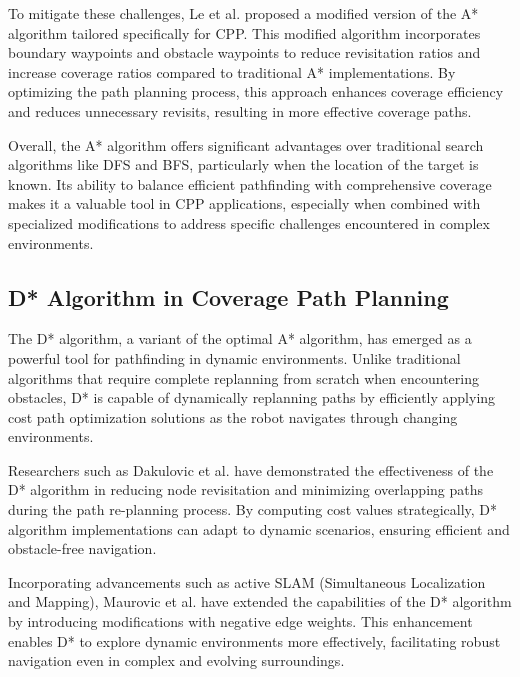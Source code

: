 \vspace*{6mm}

To mitigate these challenges, Le et al. proposed a modified version of the A* algorithm tailored specifically for CPP. This modified algorithm incorporates boundary waypoints and obstacle waypoints to reduce revisitation ratios and increase coverage ratios compared to traditional A* implementations. By optimizing the path planning process, this approach enhances coverage efficiency and reduces unnecessary revisits, resulting in more effective coverage paths.

\vspace*{6mm}

Overall, the A* algorithm offers significant advantages over traditional search algorithms like DFS and BFS, particularly when the location of the target is known. Its ability to balance efficient pathfinding with comprehensive coverage makes it a valuable tool in CPP applications, especially when combined with specialized modifications to address specific challenges encountered in complex environments.

\subsection{D* Algorithm in Coverage Path Planning}

The D* algorithm, a variant of the optimal A* algorithm, has emerged as a powerful tool for pathfinding in dynamic environments. Unlike traditional algorithms that require complete replanning from scratch when encountering obstacles, D* is capable of dynamically replanning paths by efficiently applying cost path optimization solutions as the robot navigates through changing environments.

\vspace*{6mm}

Researchers such as Dakulovic et al. have demonstrated the effectiveness of the D* algorithm in reducing node revisitation and minimizing overlapping paths during the path re-planning process. By computing cost values strategically, D* algorithm implementations can adapt to dynamic scenarios, ensuring efficient and obstacle-free navigation.

\vspace*{6mm}

Incorporating advancements such as active SLAM (Simultaneous Localization and Mapping), Maurovic et al. have extended the capabilities of the D* algorithm by introducing modifications with negative edge weights. This enhancement enables D* to explore dynamic environments more effectively, facilitating robust navigation even in complex and evolving surroundings.

